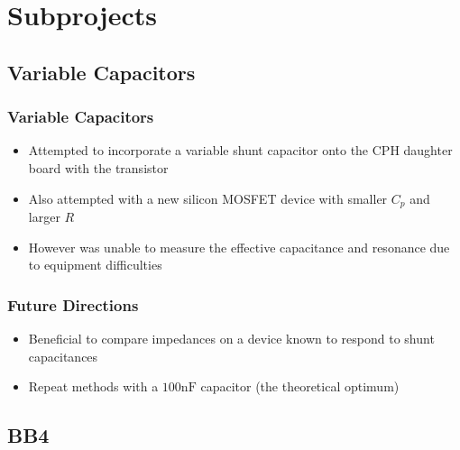 \documentclass{beamer}
\begin{document}
\section{Subprojects}

\subsection{Variable Capacitors}

\begin{frame}
    \frametitle{Variable Capacitors}


    \begin{itemize}
        \item Attempted to incorporate a variable shunt capacitor onto the CPH daughter board with the transistor
        \item Also attempted with a new silicon MOSFET device with smaller $C_p$ and larger $R$
        \item However was unable to measure the effective capacitance and resonance due to equipment difficulties
    \end{itemize}

\end{frame}

\begin{frame}
    \frametitle{Future Directions}

    \begin{itemize}
        \item Beneficial to compare impedances on a device known to respond to shunt capacitances
        \item Repeat methods with a $100\si{\nano\farad}$ capacitor (the theoretical optimum)
    \end{itemize}

\end{frame}

\subsection{BB4}
\end{document}
